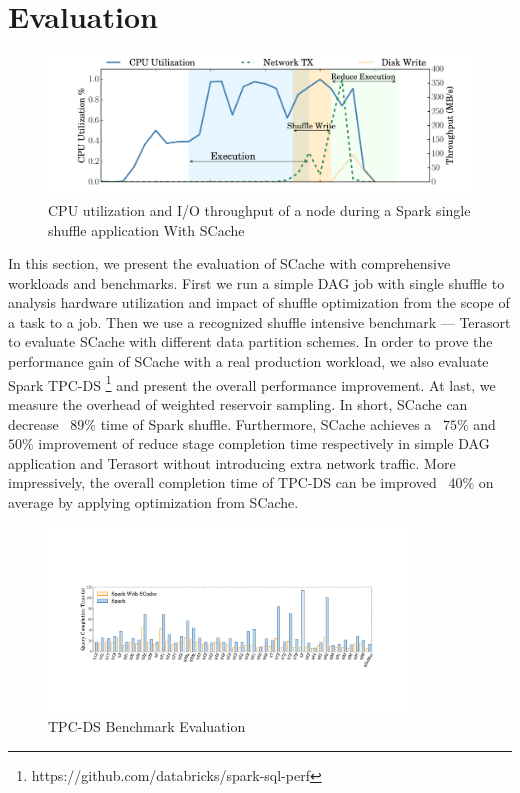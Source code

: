 \section{Evaluation}\label{evaluation}
\begin{figure}
	\includegraphics[width=\linewidth]{fig/scache_util}
	\caption{CPU utilization and I/O throughput of a node during a Spark single shuffle application With SCache}
	\label{fig:scache_util}
\end{figure}
In this section, we present the evaluation of SCache with comprehensive workloads and benchmarks. First we run a simple DAG job with single shuffle to analysis hardware utilization and impact of shuffle optimization from the scope of a task to a job. 
Then we use a recognized shuffle intensive benchmark --- Terasort \cite{spark-tera} to evaluate SCache with different data partition schemes.
In order to prove the performance gain of SCache with a real production workload, we also evaluate Spark TPC-DS \footnote{https://github.com/databricks/spark-sql-perf} and present the overall performance improvement.
At last, we measure the overhead of weighted reservoir sampling. 
In short, SCache can decrease ~$89\%$ time of Spark shuffle. Furthermore, SCache achieves a ~$75\%$ and ~$50\%$ improvement of reduce stage completion time respectively in simple DAG application and Terasort without introducing extra network traffic. More impressively, the overall completion time of TPC-DS can be improved ~$40\%$ on average by applying optimization from SCache.
\begin{figure}
	\includegraphics[width=0.85\textwidth]{fig/tpcds}
	\caption{TPC-DS Benchmark Evaluation}
	\label{fig:tpcds}
\end{figure}

